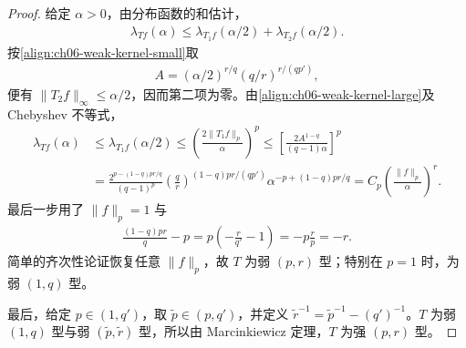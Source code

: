 \documentclass[../../main.tex]{subfiles}
\begin{document}
\begin{proof}
给定 $\alpha>0$，由分布函数的和估计，
\begin{align*}
\lambda_{Tf}(\alpha)\leqslant
\lambda_{T_1f}(\alpha/2)+\lambda_{T_2f}(\alpha/2).
\end{align*}
按\cref{align:ch06-weak-kernel-small}取
\begin{align*}
A=(\alpha/2)^{r/q}(q/r)^{r/(qp')},
\end{align*}
便有 $\|T_2f\|_\infty\leqslant\alpha/2$，因而第二项为零。由\cref{align:ch06-weak-kernel-large}及 Chebyshev 不等式，
\begin{align*}
\lambda_{Tf}(\alpha)
&\leqslant\lambda_{T_1f}(\alpha/2)
\leqslant\left(\frac{2\|T_1f\|_p}\alpha\right)^p
\leqslant\left[\frac{2A^{1-q}}{(q-1)\alpha}\right]^p\\
&=\frac{2^{p-(1-q)pr/q}}{(q-1)^p}
\left(\frac qr\right)^{(1-q)pr/(qp')}
\alpha^{-p+(1-q)pr/q}
=C_p\left(\frac{\|f\|_p}\alpha\right)^r.
\end{align*}
最后一步用了 $\|f\|_p=1$ 与
\begin{align*}
\frac{(1-q)pr}q-p
=p\left(-\frac r{q'}-1\right)=-p\frac rp=-r.
\end{align*}
简单的齐次性论证恢复任意 $\|f\|_p$，故 $T$ 为弱 $(p,r)$ 型；特别在 $p=1$ 时，为弱 $(1,q)$ 型。

最后，给定 $p\in(1,q')$，取 $\widetilde p\in(p,q')$，并定义 $\widetilde r^{-1}=\widetilde p^{-1}-(q')^{-1}$。$T$ 为弱 $(1,q)$ 型与弱 $(\widetilde p,\widetilde r)$ 型，所以由 Marcinkiewicz 定理，$T$ 为强 $(p,r)$ 型。
\end{proof}
\end{document}
